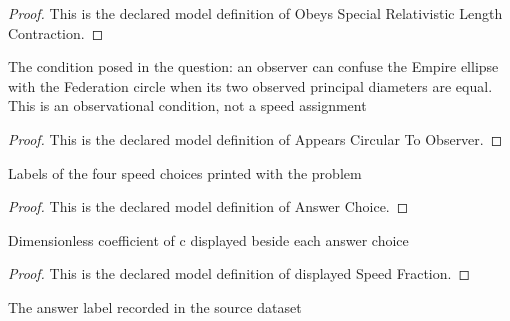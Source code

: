 \begin{proof}
  This is the declared model definition of Obeys Special Relativistic Length Contraction.
\end{proof}
\begin{definition}
  \label{def:physics:phyx-mini-0513:phyxminiproblems-problemphyxmini0513-appearscirculartoobserver}
  The condition posed in the question: an observer can confuse the Empire ellipse with the Federation circle when its two observed principal diameters are equal. This is an observational condition, not a speed assignment
\end{definition}
\begin{proof}
  This is the declared model definition of Appears Circular To Observer.
\end{proof}
\begin{definition}
  \label{def:physics:phyx-mini-0513:phyxminiproblems-problemphyxmini0513-answerchoice}
  Labels of the four speed choices printed with the problem
\end{definition}
\begin{proof}
  This is the declared model definition of Answer Choice.
\end{proof}
\begin{definition}
  \label{def:physics:phyx-mini-0513:phyxminiproblems-problemphyxmini0513-displayedspeedfraction}
  Dimensionless coefficient of c displayed beside each answer choice
\end{definition}
\begin{proof}
  This is the declared model definition of displayed Speed Fraction.
\end{proof}
\begin{definition}
  \label{def:physics:phyx-mini-0513:phyxminiproblems-problemphyxmini0513-recordeddatasetanswer}
  The answer label recorded in the source dataset
\end{definition}
